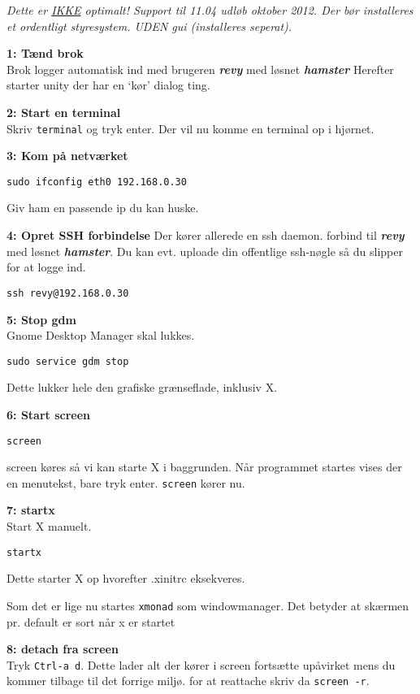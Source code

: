 \documentclass[10pt,a4paper,danish]{article}
\newcommand{\code}[1]{\colorbox{verbgray}{\texttt{#1}}}
\begin{document}
\textit{Dette er \uline{IKKE} optimalt!
  Support til 11.04 udløb oktober 2012. Der bør installeres et ordentligt
  styresystem. UDEN gui (installeres seperat).}

\textbf{1: Tænd brok}\\
Brok logger automatisk ind med brugeren \textbf{\textit{revy}} med løsnet \textbf{\textit{hamster}}
Herefter starter unity der har en `kør' dialog ting.

\textbf{2: Start en terminal}\\
Skriv \code{terminal} og tryk enter.
Der vil nu komme en terminal op i hjørnet.

\textbf{3: Kom på netværket}\\
\begin{verbatim}
sudo ifconfig eth0 192.168.0.30
\end{verbatim}
Giv ham en passende ip du kan huske.

\textbf{4: Opret SSH forbindelse}
Der kører allerede en ssh daemon.
forbind til \textbf{\textit{revy}} med løsnet \textbf{\textit{hamster}}.
Du kan evt. uploade din offentlige ssh-nøgle så du slipper for at logge ind.
\begin{verbatim}
ssh revy@192.168.0.30
\end{verbatim}

\textbf{5: Stop gdm}\\
Gnome Desktop Manager skal lukkes.
\begin{verbatim}
sudo service gdm stop
\end{verbatim}
Dette lukker hele den grafiske grænseflade, inklusiv X.

\textbf{6: Start screen}\\
\begin{verbatim}
screen
\end{verbatim}
screen køres så vi kan starte X i baggrunden.
Når programmet startes vises der en menutekst, bare tryk enter.
\texttt{screen} kører nu.

\textbf{7: startx}\\
Start X manuelt.
\begin{verbatim}
startx
\end{verbatim}
Dette starter X op hvorefter .xinitrc eksekveres.

Som det er lige nu startes \texttt{xmonad} som windowmanager.
Det betyder at skærmen pr. default er sort når x er startet


\textbf{8: detach fra screen}\\
Tryk \texttt{Ctrl-a d}. Dette lader alt der kører i screen fortsætte upåvirket
mens du kommer tilbage til det forrige miljø.
for at reattache skriv da \code{screen -r}.
\end{document}
